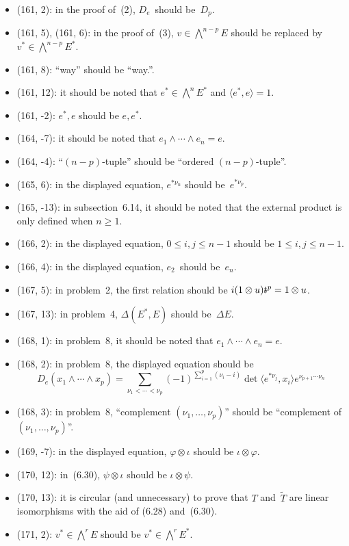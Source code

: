 \documentclass[letterpaper,12pt]{article}
\newcommand{\tprod}{\otimes}
\newcommand{\eprod}{\wedge}
\newcommand{\bigeprod}{\bigwedge}
\newcommand{\sprod}[2]{\langle#1,#2\rangle}
\newcommand{\stroked}[1]{\mathrlap{\text{\kern0.05em-}}#1}
\newcommand{\unit}{\stroked{t}}
\begin{document}
\begin{itemize}
\item (161, 2): in the proof of~(2), \(D_e\)~should be~\(D_p\).
\item (161, 5), (161, 6): in the proof of~(3), \(v\in\bigeprod^{n-p}E\) should be replaced by \(v^*\in\bigeprod^{n-p}E^*\).
\item (161, 8): ``way'' should be ``way.''.
\item (161, 12): it should be noted that \(e^*\in\bigeprod^n E^*\) and \(\sprod{e^*}{e}=1\).
\item (161, -2): \(e^*,e\) should be \(e,e^*\).
\item (164, -7): it should be noted that \(e_1\eprod\cdots\eprod e_n=e\).
\item (164, -4): ``\((n-p)\)-tuple'' should be ``ordered \((n-p)\)-tuple''.
\item (165, 6): in the displayed equation, \(e^{*\nu_n}\) should be~\(e^{*\nu_p}\).
\item (165, -13): in subsection~6.14, it should be noted that the external product is only defined when \(n\ge 1\).
\item (166, 2): in the displayed equation, \(0\le i,j\le n-1\) should be \(1\le i,j\le n-1\).
\item (166, 4): in the displayed equation, \(e_2\)~should be~\(e_n\).
\item (167, 5): in problem~2, the first relation should be \(i(1\tprod u)\unit^p=1\tprod u\).
\item (167, 13): in problem~4, \(\Delta(E^*,E)\) should be~\(\Delta E\).
\item (168, 1): in problem~8, it should be noted that \(e_1\eprod\cdots\eprod e_n=e\).
\item (168, 2): in problem~8, the displayed equation should be
\[D_e(x_1\eprod\cdots\eprod x_p)=\sum_{\nu_1<\cdots<\nu_p}(-1)^{\sum_{i=1}^p(\nu_i-i)}\det\sprod{e^{*\nu_j}}{x_i}e^{\nu_{p+1}\cdots\nu_n}\]
\item (168, 3): in problem~8, ``complement \((\nu_1,\ldots,\nu_p)\)'' should be ``complement of \((\nu_1,\ldots,\nu_p)\)''.
\item (169, -7): in the displayed equation, \(\varphi\tprod\iota\) should be \(\iota\tprod\varphi\).
\item (170, 12): in~(6.30), \(\psi\tprod\iota\) should be \(\iota\tprod\psi\).
\item (170, 13): it is circular (and unnecessary) to prove that \(T\) and~\(\widetilde{T}\) are linear isomorphisms with the aid of (6.28) and~(6.30).
\item (171, 2): \(v^*\in\bigeprod^r E\) should be \(v^*\in\bigeprod^r E^*\).

\end{itemize}
\end{document}
